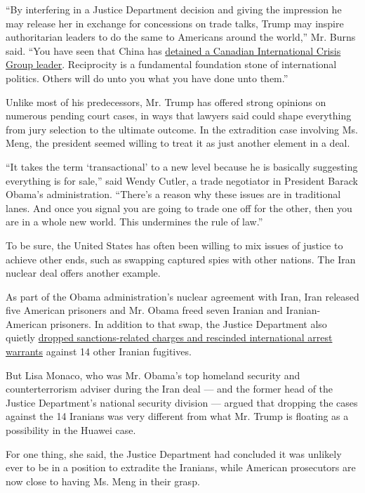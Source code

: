 ``By interfering in a Justice Department decision and giving the
impression he may release her in exchange for concessions on trade
talks, Trump may inspire authoritarian leaders to do the same to
Americans around the world,'' Mr. Burns said. ``You have seen that China
has
\href{https://www.nytimes.com/2018/12/12/world/asia/china-michael-kovrig-detained.html}{detained
a Canadian International Crisis Group leader}. Reciprocity is a
fundamental foundation stone of international politics. Others will do
unto you what you have done unto them.''

Unlike most of his predecessors, Mr. Trump has offered strong opinions
on numerous pending court cases, in ways that lawyers said could shape
everything from jury selection to the ultimate outcome. In the
extradition case involving Ms. Meng, the president seemed willing to
treat it as just another element in a deal.

``It takes the term `transactional' to a new level because he is
basically suggesting everything is for sale,'' said Wendy Cutler, a
trade negotiator in President Barack Obama's administration. ``There's a
reason why these issues are in traditional lanes. And once you signal
you are going to trade one off for the other, then you are in a whole
new world. This undermines the rule of law.''

To be sure, the United States has often been willing to mix issues of
justice to achieve other ends, such as swapping captured spies with
other nations. The Iran nuclear deal offers another example.

As part of the Obama administration's nuclear agreement with Iran, Iran
released five American prisoners and Mr. Obama freed seven Iranian and
Iranian-American prisoners. In addition to that swap, the Justice
Department also quietly
\href{https://www.politico.com/blogs/under-the-radar/2016/01/iran-deal-obama-grants-clemency-to-seven-217879}{dropped
sanctions-related charges and rescinded international arrest warrants}
against 14 other Iranian fugitives.

But Lisa Monaco, who was Mr. Obama's top homeland security and
counterterrorism adviser during the Iran deal --- and the former head of
the Justice Department's national security division --- argued that
dropping the cases against the 14 Iranians was very different from what
Mr. Trump is floating as a possibility in the Huawei case.

For one thing, she said, the Justice Department had concluded it was
unlikely ever to be in a position to extradite the Iranians, while
American prosecutors are now close to having Ms. Meng in their grasp.


